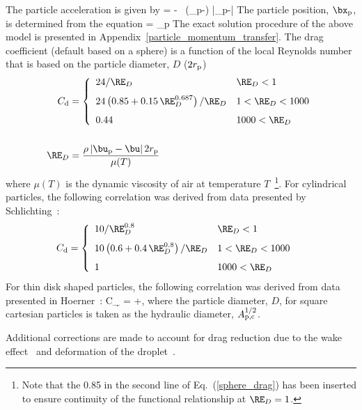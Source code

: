 The particle acceleration is given by
\be
     = \bg - \ha {} \,
    (\bu_{\rm p}-\bu) |\bu_{\rm p}-\bu|
    \label{part_accel}
\ee
The particle position, $\bx_{\rm p}$, is determined from the equation
\be
     = \bu_{\rm p}
\ee
The exact solution procedure of the above model is presented in Appendix~\ref{particle_momentum_transfer}. The drag coefficient (default based on a sphere) is a function of the local Reynolds number that is based on the particle diameter, $D$ ($2 r_{\rm p}$)
\begin{align}
 C_{\rm d} &= \left\{ \begin{array}{ll}
     24/\RE_D                                          & \RE_D < 1    \\[0.1in]
     24\left(0.85+0.15 \, \RE_D^{0.687} \right)/\RE_D  & 1 < \RE_D < 1000 \label{sphere_drag}\\[0.1in]
     0.44                                              & 1000 < \RE_D
     \end{array} \right.  \\[0.2in]
\RE_D &= \frac{\rho \, |\bu_{\rm p}-\bu| \, 2 r_{\rm p}}{\mu(T)} \end{align}
where $\mu(T)$ is the dynamic viscosity of air at temperature $T$~\cite{Crowe:1}\footnote{Note that the 0.85 in the second line of Eq.~(\ref{sphere_drag}) has been inserted to ensure continuity of the functional relationship at $\RE_D=1$.}. For cylindrical particles, the following correlation was derived from data presented by Schlichting~\cite{Schlichting:1}:
\begin{align}
 C_{\rm d} &= \left\{ \begin{array}{ll}
     10/\RE_D^{0.8}                                & \RE_D < 1    \\[0.1in]
     10\left(0.6+0.4 \, \RE_D^{0.8} \right)/\RE_D  & 1 < \RE_D < 1000 \\[0.1in]
     1                                             & 1000 < \RE_D
     \end{array} \right.
\end{align}
For thin disk shaped particles, the following correlation was derived from data presented in Hoerner~\cite{Hoerner:1965}:
\be
    C_{\d} = +,
\ee
where the particle diameter, $D$, for square cartesian particles is taken as the hydraulic diameter, $A_{\rm p,c}^{1/2}$.

Additional corrections are made to account for drag reduction due to the wake effect~\cite{Ramirez:1} and deformation of the droplet~\cite{Loth:1}.


